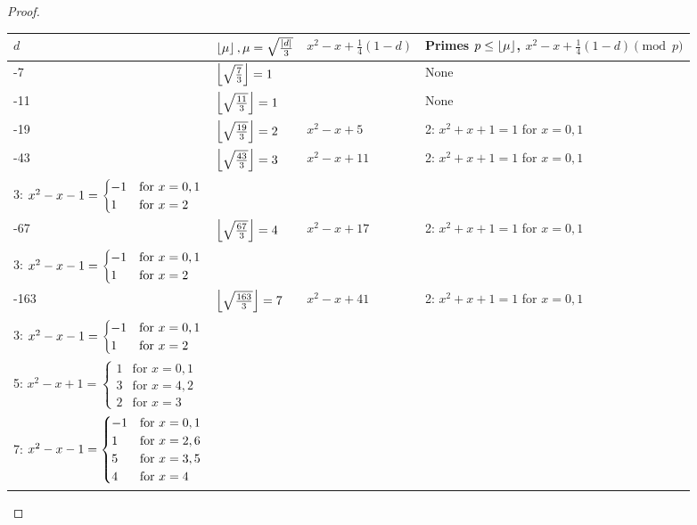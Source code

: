 \begin{proof}
\noindent \begin{tabular}{|l|>{\raggedright}p{1.2in}|>{\raggedright}p{1.2in}|>{\raggedright}p{3.2in}|}
\hline 
$d$ & $\left\lfloor {\mu}\right\rfloor,\mu=\sqrt{\frac{|d|}{3}}$ & $x^{2}-x+\frac{1}{4}(1-d)$ & Primes $p\leq\left\lfloor {\mu}\right\rfloor$, $x^{2}-x+\frac{1}{4}(1-d)\pmod{p}$\tabularnewline
\hline 
-7 & $\left\lfloor {\sqrt{\frac{7}{3}}}\right\rfloor=1$ &  & None\tabularnewline
\hline 
-11 & $\left\lfloor {\sqrt{\frac{11}{3}}}\right\rfloor=1$ &  & None\tabularnewline
\hline 
-19 & $\left\lfloor {\sqrt{\frac{19}{3}}}\right\rfloor=2$ & $x^{2}-x+5$ & 2: $x^{2}+x+1=1$ for $x=0,1$ \tabularnewline
\hline 
-43 & $\left\lfloor {\sqrt{\frac{43}{3}}}\right\rfloor=3$ & $x^{2}-x+11$ & 2: $x^{2}+x+1=1$ for $x=0,1$\\3: $x^{2}-x-1=\begin{cases}
-1 & \mbox{for \ensuremath{x=0,1}}\\
1 & \mbox{for \ensuremath{x=2}}\end{cases}$\tabularnewline
\hline 
-67 & $\left\lfloor {\sqrt{\frac{67}{3}}}\right\rfloor=4$ & $x^{2}-x+17$ & 2: $x^{2}+x+1=1$ for $x=0,1$ \\3: $x^{2}-x-1=\begin{cases}
-1 & \mbox{for \ensuremath{x=0,1}}\\
1 & \mbox{for \ensuremath{x=2}}\end{cases}$ \tabularnewline
\hline 
-163 & $\left\lfloor {\sqrt{\frac{163}{3}}}\right\rfloor=7$ & $x^{2}-x+41$ & 2: $x^{2}+x+1=1$ for $x=0,1$ \\3: $x^{2}-x-1=\begin{cases}
-1 & \mbox{for \ensuremath{x=0,1}}\\
1 & \mbox{for \ensuremath{x=2}}\end{cases}$\\
%
5: $x^{2}-x+1=\begin{cases}
1 & \mbox{for }x=0,1\\
3 & \mbox{for }x=4,2\\
2 & \mbox{for }x=3\end{cases}$\\
%
7: $x^{2}-x-1=\begin{cases}
-1 & \mbox{for \ensuremath{x=0,1}}\\
1 & \mbox{for \ensuremath{x=2,6}}\\
5 & \mbox{for \ensuremath{x=3,5}}\\
4 & \mbox{for \ensuremath{x=4}}\end{cases}$\tabularnewline
\hline
\end{tabular}
\end{proof}

